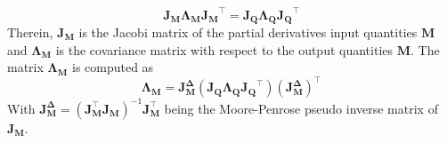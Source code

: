 \documentclass[5p,times,procedia]{elsarticle}
\begin{document}
%
\begin{equation}
	\mathbf{J_{M}}\mathbf{\Lambda_{M}}\mathbf{J_{M}}^{\top} = \mathbf{J_{Q}}\mathbf{\Lambda_{Q}}\mathbf{J_{Q}}^{\top}
\end{equation}
Therein, $\mathbf{J_{M}}$ is the Jacobi matrix of the partial derivatives input quantities $\mathbf{M}$ and $\mathbf{\Lambda_{M}}$ is the covariance matrix with respect to the output quantities $\mathbf{M}$.
The matrix $\mathbf{\Lambda_{M}}$ is computed as
\begin{equation}
	\mathbf{\Lambda_{M}} = \mathbf{J_{M}^{\Delta}} \left( \mathbf{J_{Q}}\mathbf{\Lambda_{Q}}\mathbf{J_{Q}}^{\top}\right) \left(\mathbf{J_{M}^{\Delta}}\right)^{\top}
\end{equation}
With $ \mathbf{J_{M}^{\Delta}} = \left( \mathbf{J_{M}^{\top}} \mathbf{J_{M}^{}} \right)^{-1}\mathbf{J_{M}^{\top}}$ being the Moore-Penrose pseudo inverse matrix of $\mathbf{J_M}$.
%
\end{document}

